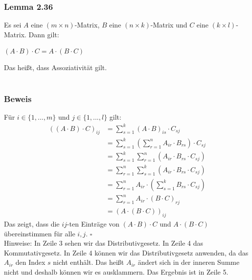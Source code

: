 \documentclass{article}
\DeclareMathOperator*{\sumop}{\sum}
\begin{document}
\subsubsection*{Lemma 2.36}
Es sei $A$ eine $(m \times n)$-Matrix, $B$ eine $(n \times k)$-Matrix und $C$ eine $(k \times l)$-Matrix. Dann gilt: \\
\begin{center}
    $(A \cdot B) \cdot C = A \cdot (B \cdot C)$
\end{center}
Das heißt, dass Assoziativität gilt. \\
\\
\subsubsection*{Beweis}
Für $i \in \{1, ..., m\}$ und $j \in \{1, ..., l\}$ gilt: \\

\begin{align*}
    ((A \cdot B) \cdot C)_{ij} &= \displaystyle\sumop_{s=1}^k (A \cdot B)_{is} \cdot C_{sj} \\
    &= \displaystyle\sumop_{s=1}^k \left( \displaystyle\sumop_{r=1}^n A_{ir} \cdot B_{rs} \right) \cdot C_{sj} \\
    &= \displaystyle\sumop_{s=1}^k \displaystyle\sumop_{r=1}^n \left(A_{ir} \cdot B_{rs} \cdot C_{sj}\right) \\
    &= \displaystyle\sumop_{r=1}^n \displaystyle\sumop_{s=1}^k \left(A_{ir} \cdot B_{rs} \cdot C_{sj}\right) \\
    &= \displaystyle\sumop_{r=1}^n A_{ir} \cdot \left( \displaystyle\sumop_{s=1}^k B_{rs} \cdot C_{sj} \right) \\
    &= \displaystyle\sumop_{r=1}^n A_{ir} \cdot (B \cdot C)_{rj} \\
    &= (A \cdot (B \cdot C))_{ij}
\end{align*}
Das zeigt, dass die $ij$-ten Einträge von $(A \cdot B) \cdot C$ und $A \cdot (B \cdot C)$ übereinstimmen für alle $i,j$. $\square$ \\
Hinweise: In Zeile 3 sehen wir das Distributivgesetz. In Zeile 4 das Kommutativgesetz. In Zeile 4 können wir das Distributivgesetz anwenden, da das $A_{ir}$ den Index $s$ nicht enthält. Das heißt $A_{ir}$ ändert sich in der inneren Summe nicht und deshalb können wir es ausklammern. Das Ergebnis ist in Zeile 5. \\
\\
\end{document}
